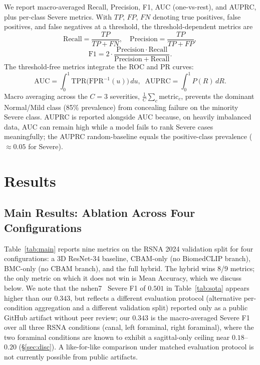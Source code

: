 \documentclass[conference]{IEEEtran}
\begin{document}
We report macro-averaged Recall, Precision, F1, AUC (one-vs-rest), and
AUPRC, plus per-class Severe metrics. With $TP$, $FP$, $FN$ denoting
true positives, false positives, and false negatives at a threshold,
the threshold-dependent metrics are
\begin{equation}
\mathrm{Recall} = \frac{TP}{TP + FN},\quad
\mathrm{Precision} = \frac{TP}{TP + FP},
\label{eq:recprec}
\end{equation}
\begin{equation}
\mathrm{F1} = 2\cdot\frac{\mathrm{Precision}\cdot\mathrm{Recall}}
                         {\mathrm{Precision} + \mathrm{Recall}}.
\label{eq:f1}
\end{equation}
The threshold-free metrics integrate the ROC and PR curves:
\begin{equation}
\mathrm{AUC} = \int_{0}^{1} \mathrm{TPR}\!\big(\mathrm{FPR}^{-1}(u)\big)\,du,
\;\;
\mathrm{AUPRC} = \int_{0}^{1} P(R)\,dR.
\label{eq:auc_auprc}
\end{equation}
Macro averaging across the $C{=}3$ severities, $\frac{1}{C}\sum_{c}
\mathrm{metric}_c$, prevents the dominant Normal/Mild class (85\%
prevalence) from concealing failure on the minority Severe class. AUPRC
is reported alongside AUC because, on heavily imbalanced data, AUC can
remain high while a model fails to rank Severe cases meaningfully; the
AUPRC random-baseline equals the positive-class prevalence
($\approx 0.05$ for Severe).

\section{Results}
\label{sec:results}

\subsection{Main Results: Ablation Across Four Configurations}

Table~\ref{tab:main} reports nine metrics on the RSNA 2024 validation
split for four configurations: a 3D ResNet-34 baseline, CBAM-only
(no BiomedCLIP branch), BMC-only (no CBAM branch), and the full
hybrid. The hybrid wins 8/9 metrics; the only metric on which it does
not win is Mean Accuracy, which we discuss below. We note that the
nshen7~\cite{nshen2024} Severe F1 of $0.501$ in Table~\ref{tab:sota}
appears higher than our $0.343$, but reflects a different evaluation
protocol (alternative per-condition aggregation and a different
validation split) reported only as a public GitHub artifact without
peer review; our
$0.343$ is the macro-averaged Severe F1 over all three RSNA
conditions (canal, left foraminal, right foraminal), where the two
foraminal conditions are known to exhibit a sagittal-only ceiling
near $0.18$--$0.20$ (\S\ref{sec:disc}). A like-for-like comparison
under matched evaluation protocol is not currently possible from
public artifacts.
\end{document}
